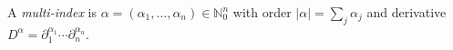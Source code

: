 
A \emph{multi-index} is $\alpha=(\alpha_1,\ldots,\alpha_n)\in\mathbb N_0^n$ with order $|\alpha|=\sum_j\alpha_j$ and derivative $D^\alpha=\partial_1^{\alpha_1}\cdots\partial_n^{\alpha_n}$.
